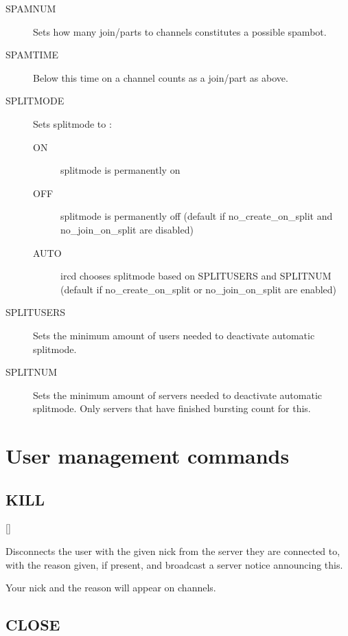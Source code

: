 \begin{description}
\item[{SPAMNUM}]
	Sets how many join/parts to channels constitutes a possible spambot.

\item[{SPAMTIME}]
	Below this time on a channel
	counts as a join/part as above.

\item[{SPLITMODE}]
	Sets splitmode to :
\noindent
\begin{description}
\item[{ON}]
	splitmode is permanently on

\item[{OFF}]
	splitmode is permanently off (default if no\_create\_on\_split and
	no\_join\_on\_split are disabled)

\item[{AUTO}]
	ircd chooses splitmode based on SPLITUSERS and SPLITNUM (default if
	no\_create\_on\_split or no\_join\_on\_split are enabled)
\end{description}

\item[{SPLITUSERS}]
	Sets the minimum amount of users needed to deactivate automatic
	splitmode.

\item[{SPLITNUM}]
	Sets the minimum amount of servers needed to deactivate automatic
	splitmode. Only servers that have finished bursting count for this.
\end{description}

\section{User management commands}
\label{usercommands}

\subsection{KILL}

	 []

	Disconnects the user with the given nick from the server they are
	connected to, with the reason given, if present, and broadcast a server
	notice announcing this.

	Your nick and the reason will appear on channels.

\subsection{CLOSE}

